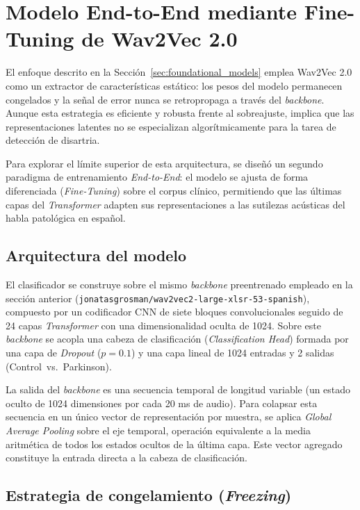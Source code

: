 \section{Modelo End-to-End mediante Fine-Tuning de Wav2Vec 2.0}\label{sec:end2end}

El enfoque descrito en la Sección~\ref{sec:foundational_models} emplea Wav2Vec 2.0 como un extractor de características estático: los pesos del modelo permanecen congelados y la señal de error nunca se retropropaga a través del \textit{backbone}. Aunque esta estrategia es eficiente y robusta frente al sobreajuste, implica que las representaciones latentes no se especializan algorítmicamente para la tarea de detección de disartria.

Para explorar el límite superior de esta arquitectura, se diseñó un segundo paradigma de entrenamiento \textit{End-to-End}: el modelo se ajusta de forma diferenciada (\textit{Fine-Tuning}) sobre el corpus clínico, permitiendo que las últimas capas del \textit{Transformer} adapten sus representaciones a las sutilezas acústicas del habla patológica en español.

\subsection{Arquitectura del modelo}

El clasificador se construye sobre el mismo \textit{backbone} preentrenado empleado en la sección anterior (\texttt{jonatasgrosman/wav2vec2-large-xlsr-53-spanish}), compuesto por un codificador CNN de siete bloques convolucionales seguido de 24 capas \textit{Transformer} con una dimensionalidad oculta de 1024. Sobre este \textit{backbone} se acopla una cabeza de clasificación (\textit{Classification Head}) formada por una capa de \textit{Dropout} ($p = 0.1$) y una capa lineal de 1024 entradas y 2 salidas (Control~vs.~Parkinson).

La salida del \textit{backbone} es una secuencia temporal de longitud variable (un estado oculto de 1024 dimensiones por cada 20 ms de audio). Para colapsar esta secuencia en un único vector de representación por muestra, se aplica \textit{Global Average Pooling} sobre el eje temporal, operación equivalente a la media aritmética de todos los estados ocultos de la última capa. Este vector agregado constituye la entrada directa a la cabeza de clasificación.

\subsection{Estrategia de congelamiento (\textit{Freezing})}

